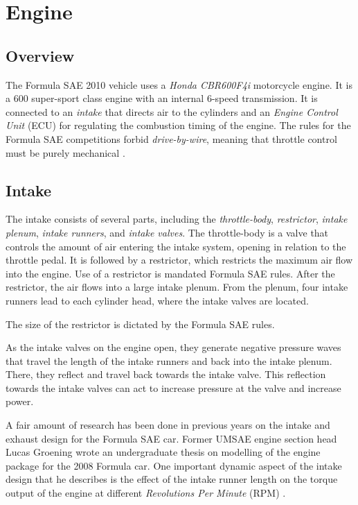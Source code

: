 \section{Engine}

\subsection{Overview}

The Formula SAE 2010 vehicle uses a \emph{Honda CBR600F4i} motorcycle engine. It is a \unit{600}{\centi\cubic\metre} super-sport class engine with an internal 6-speed transmission. It is connected to an \emph{intake} that directs air to the cylinders and an \emph{Engine Control Unit} (ECU) for regulating the combustion timing of the engine. The rules for the Formula SAE competitions forbid \emph{drive-by-wire}, meaning that throttle control must be purely mechanical \cite{2010fsaerules}.

\subsection{Intake}

The intake consists of several parts, including the \emph{throttle-body}, \emph{restrictor}, \emph{intake plenum}, \emph{intake runners}, and \emph{intake valves}. The throttle-body is a valve that controls the amount of air entering the intake system, opening in relation to the throttle pedal. It is followed by a restrictor, which restricts the maximum air flow into the engine. Use of a restrictor is mandated Formula SAE rules. After the restrictor, the air flows into a large intake plenum. From the plenum, four intake runners lead to each cylinder head, where the intake valves are located.

The size of the restrictor is dictated by the Formula SAE rules.

As the intake valves on the engine open, they generate negative pressure waves that travel the length of the intake runners and back into the intake plenum. There, they reflect and travel back towards the intake valve. This reflection towards the intake valves can act to increase pressure at the valve and increase power.


A fair amount of research has been done in previous years on the intake and exhaust design for the Formula SAE car. Former UMSAE engine section head Lucas Groening wrote an undergraduate thesis on modelling of the engine package for the 2008 Formula car. One important dynamic aspect of the intake design that he describes is the effect of the intake runner length on the torque output of the engine at different \emph{Revolutions Per Minute} (RPM) \cite{LucasIntake}. 

